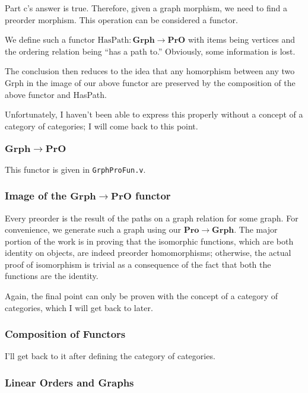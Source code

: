 \documentclass[12pt,twocolumn,oneside]{book}
\begin{document}
Part c's answer is true. Therefore, given a graph morphism, we need to find a preorder
morphism. This operation can be considered a functor.

We define such a functor $\mathrm{HasPath} : \mathbf{Grph} \to \mathbf{PrO}$ with items being vertices
and the ordering relation being ``has a path to.'' Obviously, some information is lost.

The conclusion then reduces to the idea that any homorphism between any two Grph
in the image of our above functor are preserved by the composition of the above
functor and HasPath.

Unfortunately, I haven't been able to express this properly without a concept of
a category of categories; I will come back to this point.


\subsubsection{$\mathbf{Grph} \to \mathbf{PrO}$}

This functor is given in \texttt{GrphProFun.v}.


\subsubsection{Image of the $\mathbf{Grph} \to \mathbf{PrO}$ functor}

Every preorder is the result of the paths on a graph relation for some graph. For convenience,
we generate such a graph using our $\mathbf{Pro} \to \mathbf{Grph}$. The major
portion of the work is in proving that the isomorphic functions, which are both
identity on objects, are indeed preorder homomorphisms; otherwise, the actual proof
of isomorphism is trivial as a consequence of the fact that both the functions are
the identity.

Again, the final point can only be proven with the concept of a category of categories,
which I will get back to later.

\subsubsection{Composition of Functors}

I'll get back to it after defining the category of categories.

\subsubsection{Linear Orders and Graphs}
\end{document}

